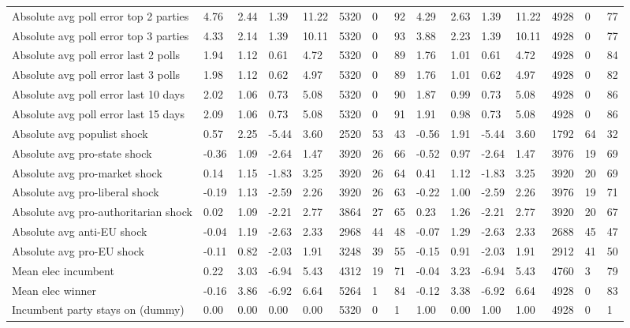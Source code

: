 \begin{longtable}{lllllllllllllll}
Absolute avg poll error top 2 parties & 4.76 & 2.44 & 1.39 & 11.22 & 5320 & 0 & 92 & 4.29 & 2.63 & 1.39 & 11.22 & 4928 & 0 & 77\\
Absolute avg poll error top 3 parties & 4.33 & 2.14 & 1.39 & 10.11 & 5320 & 0 & 93 & 3.88 & 2.23 & 1.39 & 10.11 & 4928 & 0 & 77\\
\addlinespace
Absolute avg poll error last 2 polls & 1.94 & 1.12 & 0.61 & 4.72 & 5320 & 0 & 89 & 1.76 & 1.01 & 0.61 & 4.72 & 4928 & 0 & 84\\
Absolute avg poll error last 3 polls & 1.98 & 1.12 & 0.62 & 4.97 & 5320 & 0 & 89 & 1.76 & 1.01 & 0.62 & 4.97 & 4928 & 0 & 82\\
Absolute avg poll error last 10 days & 2.02 & 1.06 & 0.73 & 5.08 & 5320 & 0 & 90 & 1.87 & 0.99 & 0.73 & 5.08 & 4928 & 0 & 86\\
Absolute avg poll error last 15 days & 2.09 & 1.06 & 0.73 & 5.08 & 5320 & 0 & 91 & 1.91 & 0.98 & 0.73 & 5.08 & 4928 & 0 & 86\\
Absolute avg populist shock & 0.57 & 2.25 & -5.44 & 3.60 & 2520 & 53 & 43 & -0.56 & 1.91 & -5.44 & 3.60 & 1792 & 64 & 32\\
\addlinespace
Absolute avg pro-state shock & -0.36 & 1.09 & -2.64 & 1.47 & 3920 & 26 & 66 & -0.52 & 0.97 & -2.64 & 1.47 & 3976 & 19 & 69\\
Absolute avg pro-market shock & 0.14 & 1.15 & -1.83 & 3.25 & 3920 & 26 & 64 & 0.41 & 1.12 & -1.83 & 3.25 & 3920 & 20 & 69\\
Absolute avg pro-liberal shock & -0.19 & 1.13 & -2.59 & 2.26 & 3920 & 26 & 63 & -0.22 & 1.00 & -2.59 & 2.26 & 3976 & 19 & 71\\
Absolute avg pro-authoritarian shock & 0.02 & 1.09 & -2.21 & 2.77 & 3864 & 27 & 65 & 0.23 & 1.26 & -2.21 & 2.77 & 3920 & 20 & 67\\
Absolute avg anti-EU shock & -0.04 & 1.19 & -2.63 & 2.33 & 2968 & 44 & 48 & -0.07 & 1.29 & -2.63 & 2.33 & 2688 & 45 & 47\\
\addlinespace
Absolute avg pro-EU shock & -0.11 & 0.82 & -2.03 & 1.91 & 3248 & 39 & 55 & -0.15 & 0.91 & -2.03 & 1.91 & 2912 & 41 & 50\\
Mean elec incumbent & 0.22 & 3.03 & -6.94 & 5.43 & 4312 & 19 & 71 & -0.04 & 3.23 & -6.94 & 5.43 & 4760 & 3 & 79\\
Mean elec winner & -0.16 & 3.86 & -6.92 & 6.64 & 5264 & 1 & 84 & -0.12 & 3.38 & -6.92 & 6.64 & 4928 & 0 & 83\\
Incumbent party stays on (dummy) & 0.00 & 0.00 & 0.00 & 0.00 & 5320 & 0 & 1 & 1.00 & 0.00 & 1.00 & 1.00 & 4928 & 0 & 1\\

\end{longtable}
